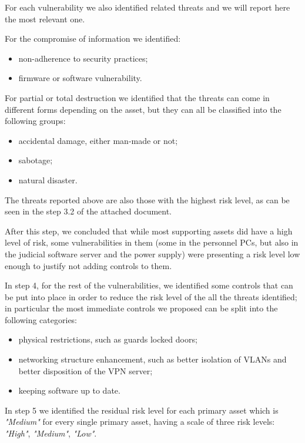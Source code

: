 For each vulnerability we also identified related threats and we will report here the most relevant one.

For the compromise of information we identified:

\begin{itemize}
    \item non-adherence to security practices;
    \item firmware or software vulnerability.
\end{itemize}

For partial or total destruction we identified that the threats can come in different forms depending on the asset, but they can all be classified into the following groups:

\begin{itemize}
    \item accidental damage, either man-made or not;
    \item sabotage;
    \item natural disaster.
\end{itemize}

The threats reported above are also those with the highest risk level, as can be seen in the step 3.2 of the attached document.

After this step, we concluded that while most supporting assets did have a high level of risk, some vulnerabilities in them (some in the personnel PCs, but also in the judicial software server and the power supply) were presenting a risk level low enough to justify not adding controls to them.

In step 4, for the rest of the vulnerabilities, we identified some controls that can be put into place in order to reduce the risk level of the all the threats identified; in particular the most immediate controls we proposed can be split into the following categories:

\begin{itemize}
    \item physical restrictions, such as guards locked doors;
    \item networking structure enhancement, such as better isolation of VLANs and better disposition of the VPN server;
    \item keeping software up to date.
\end{itemize}

In step 5 we identified the residual risk level for each primary asset which is \textit{"Medium"} for every single primary asset, having a scale of three risk levels: \textit{"High"}, \textit{"Medium"}, \textit{"Low"}.

